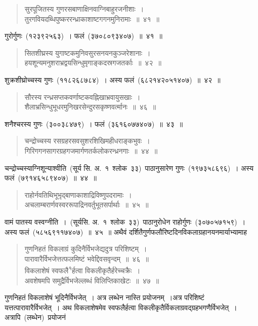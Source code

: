 \documentclass[11pt, openany]{book}
\begin{document}
\newpage
\thispagestyle{fancy}
\fancyhf{}
\begin{quote}
{\ks सुरपूजितस्य गुणरसबाणाक्षिनवाग्निबाहुरजनीशाः~।\\
तुरगवियदब्धिपुष्कररन्ध्राकाशाष्टगगनमुनिरामाः~॥~४१~॥}
\end{quote}
\indent
गुरोर्गुणः~(१२३९२५६३)~। फलं~(३७०८०९३४०७)~॥~४१~॥
\begin{quote}
{\ks सितशीघ्रस्य युगाष्टकमुनिवसुरसनयनकुञ्जरेशानाः~।\\
हयशून्यमनुशराभ्रद्वयसिन्धुमृगाङ्कदस्रगजतर्काः~॥~४२~॥}
\end{quote}
\indent
शुक्रशीघ्रोच्चस्य गुणः~(११८२६८७८४)~। अस्य फलं~(६८२१४२०५१४०७)~॥~४२~॥
\begin{quote}
{\ks सौरस्य रन्ध्रसप्तकवर्णाष्टकवह्निखाभ्रवायुसखाः~।\\
शैलाभ्रसिन्धुभूधरमुनिखरसेन्दुरसकृष्णवर्त्मानः~॥~४६~॥}
\end{quote}
\indent
शनैश्चरस्य गुणः~(३००३८४७९)~। फलं~(३६१६०७७४०७)~॥~४३~॥
\begin{quote}
{\ks चन्द्रोच्चस्य रसग्रहरसवसुशरशिखिमहीधराङ्कभुवः~।\\
गिरिगगनसागरग्रहगजमार्गणतर्कलोकरन्ध्रनगाः~॥~४४~॥}
\end{quote}
\indent
चन्द्रोच्चस्याग्निशून्याश्वीति~(सूर्य सि. अ.~१~श्लोक~३३)~पाठानुसारेण गुणः~(१९७३५८६९६)~। अस्य फलं~(७९१४६५८९४०७)~॥~४४~॥
\begin{quote}
{\ks राहोर्नवतिथिभूभृद्बाणाकाशाद्रिविष्णुपदरामाः~।\\
अचलाम्बरार्णवस्वररूपाद्रिनवर्तुभूतसर्पार्थाः~॥~४५~॥}
\end{quote}
\indent
वामं पातस्य वस्वग्नीति~।~(सूर्यसि. अ.~१~श्लोक~३३)~पाठानुरोधेन राहोर्गुणः~(३०७०५७१५९)~। अस्य फलं~(५८५६९११७४०७)~॥~४५~॥
\indent
अथैवं दर्शितैगुर्णफलौरिष्टदिनविकलाग्रहानयनमार्याभ्यामाह\textendash
\begin{quote}
{\ks गुणनिहतं विकलाग्रं कुदिनैर्विभजेद्यदुत्र परिशिष्टम्~।\\
पारावारैर्विभजेत्तत्फलमिष्टं भवेद्दिवसवृन्दम्~॥~४६~॥\\
विकलाशेषं स्वफलै\textsuperscript{१}र्हत्वा विकलीकृतैर्हरेच्चक्रैः~।\\
अवशेषमपि समुद्रैर्विभजेल्लब्धं विलिप्तिकाखेटः~॥~४७~॥}
\end{quote}
\indent
गुणनिहतं विकलाशेषं भूदिनैर्विभजेत्~। अत्र लब्धेन नास्ति प्रयोजनम्~।अत्र परिशिष्टं यत्तत्पारावारैर्विभजेत्~। अथ विकलाशेषमेव स्वफलैर्हत्वा विकलीकृतैर्विकलाग्रवद्ग्रहभगणैर्विभजेत्~। अत्रापि~(लब्धेन)~प्रयोजनं
\end{document}
